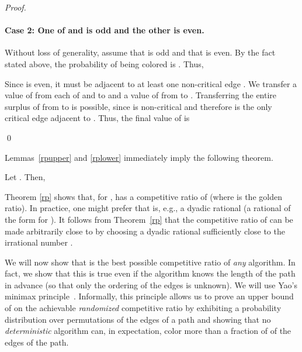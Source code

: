 \documentclass[smallextended]{svjour3}
\begin{document}
\begin{proof}
\paragraph{Case 2: One of  and  is odd and the other is even.} Without loss of generality, assume that  is odd and that  is even. By the fact stated above, the probability of  being colored is .
Thus,
 
 Since  is even, it must be adjacent to at least one non-critical edge . We transfer a value of  from each of  and  to  and a value of  from  to . Transferring the entire surplus of  from  to  is possible, since  is non-critical and therefore  is the only critical edge adjacent to . 
Thus, the final value of  is 

\qed\end{proof}

Lemmas~\ref{rpupper} and \ref{rplower} immediately imply the following theorem.

\begin{theorem}
\label{rp}
Let . Then,

\end{theorem}

Theorem \ref{rp} shows that, for ,  has a
 competitive ratio of  (where  is the golden ratio). In practice, one might prefer that  is, e.g., a dyadic rational (a rational of the form  for ). It follows from Theorem~\ref{rp} that the competitive ratio of  can be made arbitrarily close to  by choosing a dyadic rational  sufficiently close to the irrational number .

We will now show that  is the best possible competitive ratio of \emph{any} algorithm. In fact, we show that this is true even if the algorithm knows the length of the path in advance (so that only the ordering of the edges is unknown). We will use Yao's minimax principle~\cite{Yao,BE98b}. Informally, this principle allows us to prove an upper bound of  on the achievable \emph{randomized} competitive ratio by exhibiting a probability distribution over permutations of the edges of a path and showing that no \emph{deterministic} algorithm can, in expectation, color more than a fraction of  of the edges of the path.
\end{document}
